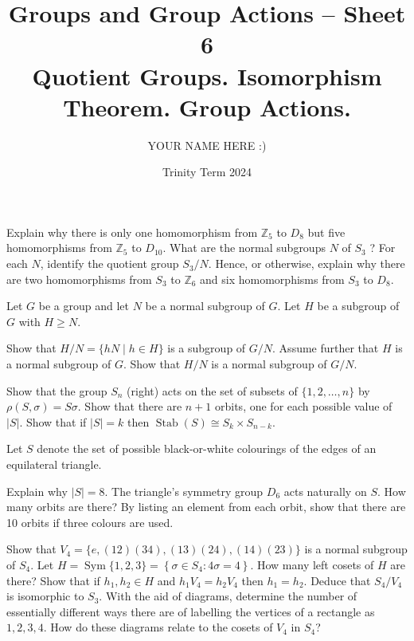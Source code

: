 \documentclass[answers]{exam}
\title{Groups and Group Actions -- Sheet 6\\Quotient Groups. Isomorphism Theorem. Group Actions.}
\author{YOUR NAME HERE :)}
\date{Trinity Term 2024}
\begin{document}
\maketitle
\begin{questions}
\question%
\begin{subparts}
\subpart Explain why there is only one homomorphism from $\mathbb{Z}_{5}$ to $D_{8}$ but five homomorphisms from $\mathbb{Z}_{5}$ to $D_{10}$.
\subpart What are the normal subgroups $N$ of $S_{3}$ ? For each $N$, identify the quotient group $S_{3} / N$.
\subpart Hence, or otherwise, explain why there are two homomorphisms from $S_{3}$ to $\mathbb{Z}_{6}$ and six homomorphisms from $S_{3}$ to $D_{8}$.
\end{subparts}



\question%
Let $G$ be a group and let $N$ be a normal subgroup of $G$. Let $H$ be a subgroup of $G$ with $H \geqslant N$.
\begin{subparts}
\subpart Show that $H / N=\{h N \mid h \in H\}$ is a subgroup of $G / N$.
\subpart Assume further that $H$ is a normal subgroup of $G$. Show that $H / N$ is a normal subgroup of $G / N$.
\end{subparts}



\question%
\begin{subparts}
\subpart Show that the group $S_{n}$ (right) acts on the set of subsets of $\{1,2, \ldots, n\}$ by $\rho(S, \sigma)=S \sigma$.
\subpart Show that there are $n+1$ orbits, one for each possible value of $|S|$.
\subpart Show that if $|S|=k$ then $\operatorname{Stab}(S) \cong S_{k} \times S_{n-k}$.
\end{subparts}



\question%
Let $S$ denote the set of possible black-or-white colourings of the edges of an equilateral triangle.
\begin{subparts}
\subpart Explain why $|S|=8$.
\subpart The triangle's symmetry group $D_{6}$ acts naturally on $S$. How many orbits are there?
\subpart By listing an element from each orbit, show that there are 10 orbits if three colours are used.
\end{subparts}



\question%
\begin{subparts}
\subpart Show that $V_{4}=\{e,(12)(34),(13)(24),(14)(23)\}$ is a normal subgroup of $S_{4}$.
\subpart Let $H=\operatorname{Sym}\{1,2,3\}=\left\{\sigma \in S_{4}: 4 \sigma=4\right\}$. How many left cosets of $H$ are there? Show that if $h_{1}, h_{2} \in H$ and $h_{1} V_{4}=h_{2} V_{4}$ then $h_{1}=h_{2}$.
\subpart Deduce that $S_{4} / V_{4}$ is isomorphic to $S_{3}$.
\subpart With the aid of diagrams, determine the number of essentially different ways there are of labelling the vertices of a rectangle as $1,2,3,4$. How do these diagrams relate to the cosets of $V_{4}$ in $S_{4}$?
\end{subparts}

\end{questions}
\end{document}
